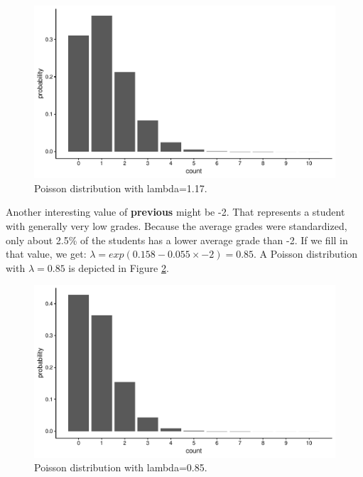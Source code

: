 \documentclass[]{book}\usepackage[]{graphicx}\usepackage[]{color}
\makeatletter
\def\maxwidth{ %
  \ifdim\Gin@nat@width>\linewidth
    \linewidth
  \else
    \Gin@nat@width
  \fi
}
\newenvironment{knitrout}{}{} %
\makeatother
\begin{document}
\begin{knitrout}
\color{fgcolor}\begin{figure}

{\centering \includegraphics[width=\maxwidth]{figure/gen_16-1} 

}

\caption[Poisson distribution with lambda=1.17]{Poisson distribution with lambda=1.17.}\label{fig:gen_16}
\end{figure}


\end{knitrout}

Another interesting value of \textbf{previous} might be -2. That represents a student with generally very low grades. Because the average grades were standardized, only about 2.5\% of the students has a lower average grade than -2. If we fill in that value, we get: $\lambda=exp(0.158  -0.055 \times -2)= 0.85$. A Poisson distribution with $\lambda=0.85$ is depicted in Figure \ref{fig:gen_17}.

\begin{knitrout}
\color{fgcolor}\begin{figure}

{\centering \includegraphics[width=\maxwidth]{figure/gen_17-1} 

}

\caption[Poisson distribution with lambda=0.85]{Poisson distribution with lambda=0.85.}\label{fig:gen_17}
\end{figure}


\end{knitrout}
\end{document}
